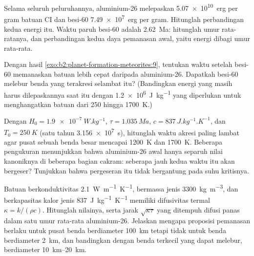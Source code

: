 \begin{exercise}[$\star\star$]\label{exo:b2:planet-formation-meteorites:9}
Selama seluruh peluruhannya, aluminium-26 melepaskan \qty{5.07e10}{erg} per gram batuan
CI dan besi-60 \qty{7.49e7}{erg} per gram. Hitunglah perbandingan kedua
energi itu. Waktu paruh besi-60 adalah \qty{2.62}{Ma}: hitunglah umur rata-ratanya,
dan perbandingan kedua daya pemanasan awal, yaitu energi dibagi umur rata-rata.
\end{exercise}

\begin{exercise}[$\star\star\star$]\label{exo:b2:planet-formation-meteorites:10}
Dengan hasil \cref{exo:b2:planet-formation-meteorites:9}, tentukan waktu setelah besi-60 memanaskan batuan
lebih cepat daripada aluminium-26. Dapatkah besi-60 melebur benda yang terakresi
selambat itu? (Bandingkan energi yang masih harus dilepaskannya saat itu dengan
\qty{1.2e6}{J.kg^{-1}} yang diperlukan untuk menghangatkan batuan dari \num{250} hingga \qty{1700}{K}.)
\end{exercise}

\begin{exercise}[$\star\star\star$]\label{exo:b2:planet-formation-meteorites:11}
Dengan $H_0 = \qty{1.9e-7}{W.kg^{-1}}$, $\tau = \qty{1.035}{Ma}$,
$c = \qty{837}{J.kg^{-1}.K^{-1}}$, dan $T_0 = \qty{250}{K}$ (satu tahun
\qty{3.156e7}{s}), hitunglah waktu akresi paling lambat agar pusat sebuah
benda besar mencapai \qty{1200}{K} dan \qty{1700}{K}. Beberapa pengukuran menunjukkan bahwa
aluminium-26 awal hanya separuh nilai kanoniknya di beberapa bagian cakram:
seberapa jauh kedua waktu itu akan bergeser? Tunjukkan bahwa pergeseran itu tidak bergantung pada
suhu kritisnya.
\end{exercise}

\begin{exercise}[$\star\star\star$]\label{exo:b2:planet-formation-meteorites:12}
Batuan berkonduktivitas \qty{2.1}{W.m^{-1}.K^{-1}}, bermassa jenis
\qty{3300}{kg.m^{-3}}, dan berkapasitas kalor jenis \qty{837}{J.kg^{-1}.K^{-1}} memiliki
difusivitas termal $\kappa = k/(\rho c)$. Hitunglah nilainya, serta jarak
$\sqrt{\kappa\tau}$ yang ditempuh difusi panas dalam satu umur rata-rata aluminium-26.
Jelaskan mengapa proposisi pemanasan berlaku untuk pusat benda berdiameter
\qty{100}{km} tetapi tidak untuk benda berdiameter \qty{2}{km}, dan bandingkan dengan
benda terkecil yang dapat melebur, berdiameter \qtyrange{10}{20}{km}.
\end{exercise}

